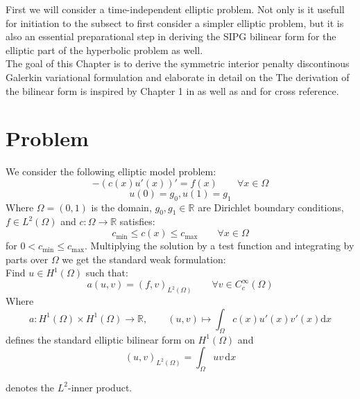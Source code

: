First we will consider a time-independent elliptic problem. Not only is it 
usefull for initiation to the subsect to first consider a simpler elliptic problem, but it 
is also an essential preparational step in deriving the SIPG bilinear form for the 
elliptic part of the hyperbolic problem as well. \\
The goal of this Chapter is to derive the symmetric interior penalty discontinous Galerkin
variational formulation and elaborate in detail on the   
The derivation
of the bilinear form is inspired by 
Chapter 1 in \cite{riviere2008} as well as \cite{georgoulis2011Springer} and \cite{grote2006}
for cross reference.

\section{Problem}
We consider the following elliptic model problem:
\begin{equation}
    \label{eq:elliptic_pde}
    -(c(x)u'(x))' = f(x) \qquad \forall x\in \Omega
\end{equation} 
\begin{equation}
    \label{eq:elliptic_pde_bc}
    u(0) = g_0, u(1) = g_1
\end{equation}
Where $\Omega = (0,1)$ is the domain, $g_0, g_1 \in \mathbb{R}$ are
Dirichlet boundary conditions, $f \in L^2(\Omega)$ and $c:\Omega \to \mathbb{R}$
satisfies:
\[
    c_{\min} \leq c(x) \leq c_{\max} \qquad \forall x\in \Omega
\]
for $0 < c_{\min} \leq c_{\max}$.
Multiplying the solution by a test function and integrating by parts over $\Omega$ we get the 
standard weak formulation: \\
Find $u \in H^1(\Omega)$ such that:
\begin{equation}
    a(u,v) = (f,v)_{L^2(\Omega)} \qquad \forall v \in C_c^{\infty}(\Omega)
\end{equation}
Where 
\[
    a:H^1(\Omega) \times H^1(\Omega) \to \mathbb{R}, \qquad (u,v) \mapsto \int_{\Omega} c(x)u'(x)v'(x) \text{d}x
\]  
defines the standard elliptic bilinear form on $H^1(\Omega)$ and 
\[
    (u,v)_{L^2(\Omega)} = \int_{\Omega} uv \,\text{d}x
\]

denotes the $L^2$-inner product.


